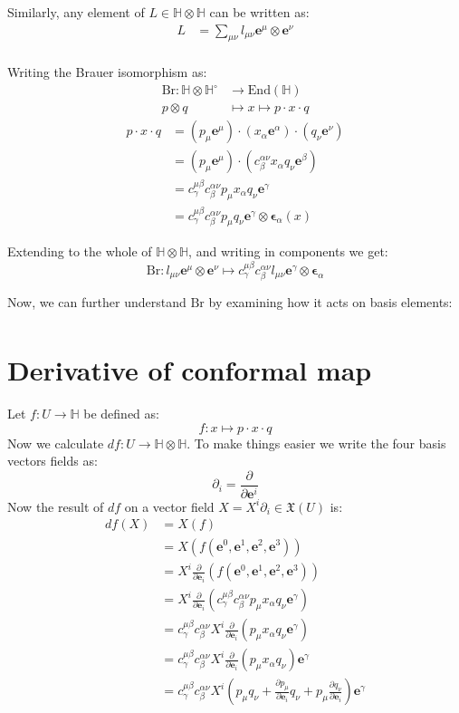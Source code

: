 \documentclass{amsart}
\providecommand{\HH}{\mathbb{H}}
\newcommand{\End}{\mathrm{End}}
\newcommand{\e}{\boldsymbol{e}}
\newcommand{\ep}{\boldsymbol{\epsilon}}
\newcommand{\1}{\boldsymbol{1}}
\begin{document}
Similarly, any element of $L \in \HH\otimes\HH$ can be written as:
\begin{align*}
  L &= \sum_{\mu\nu} l_{\mu\nu} \e^\mu \otimes \e^\nu \\
\end{align*}

Writing the Brauer isomorphism as:
\begin{align*}
  \mathrm{Br} : \HH\otimes\HH^\circ &\to \End(\HH) \\
      p \otimes q &\mapsto x \mapsto p\cdot x\cdot q
\end{align*}
\begin{align*}
  p\cdot x\cdot q &= (p_\mu\e^\mu)\cdot(x_\alpha\e^\alpha)\cdot(q_\nu\e^\nu)\\
  &= (p_\mu\e^\mu)\cdot(c^{\alpha\nu}_\beta x_\alpha q_\nu\e^\beta) \\
  &= c^{\mu\beta}_\gamma c^{\alpha\nu}_\beta p_\mu x_\alpha q_\nu\e^\gamma \\
  &= c^{\mu\beta}_\gamma c^{\alpha\nu}_\beta p_\mu q_\nu \e^\gamma\otimes\ep_\alpha (x)
\end{align*}

Extending to the whole of $\HH\otimes\HH$, and writing in components we get:
$$ \mathrm{Br} : l_{\mu\nu}\e^\mu\otimes\e^\nu \mapsto
                 c^{\mu\beta}_\gamma c^{\alpha\nu}_\beta l_{\mu\nu}
                 \e^\gamma\otimes\ep_\alpha $$


Now, we can further understand $\mathrm{Br}$ by examining how it acts on basis
elements:
\begin{align*}
  
\end{align*}

\section{Derivative of conformal map}

Let $f : U \to \HH$ be defined as:
$$ f : x \mapsto p\cdot x \cdot q$$
Now we calculate $df : U \to \HH \otimes \HH$. To make things easier we write
the four basis vectors fields as:
$$ \partial_i = \frac{\partial}{\partial \e^i}$$
Now the result of $df$ on a vector field $X = X^i\partial_i \in \mathfrak{X}(U)$
is:
\begin{align*}
  df(X) &= X(f) \\
   &= X(f(\e^0,\e^1,\e^2,\e^3)) \\
   &= X^i\frac{\partial}{\partial \e_i} (f(\e^0,\e^1,\e^2,\e^3)) \\
   &= X^i\frac{\partial}{\partial \e_i} (c^{\mu\beta}_\gamma c^{\alpha\nu}_\beta p_\mu x_\alpha q_\nu\e^\gamma) \\
   &= c^{\mu\beta}_\gamma c^{\alpha\nu}_\beta X^i\frac{\partial}{\partial \e_i} (p_\mu x_\alpha q_\nu\e^\gamma) \\
   &= c^{\mu\beta}_\gamma c^{\alpha\nu}_\beta X^i\frac{\partial}{\partial \e_i} (p_\mu x_\alpha q_\nu) \e^\gamma \\
   &= c^{\mu\beta}_\gamma c^{\alpha\nu}_\beta X^i(p_\mu q_\nu + \frac{\partial p_\mu}{\partial \e_i} q_\nu +  p_\mu\frac{\partial q_\nu}{\partial \e_i}) \e^\gamma \\
\end{align*}
\end{document}
